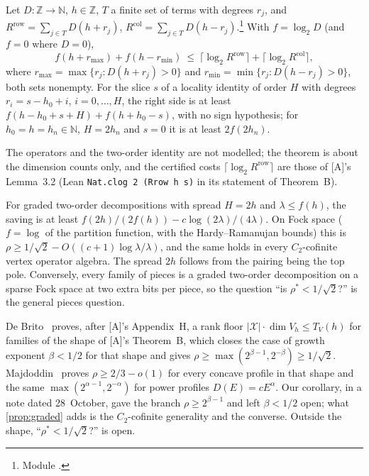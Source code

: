 \documentclass[10pt]{amsart}
\theoremstyle{plain}
\theoremstyle{definition}
\theoremstyle{remark}
\numberwithin{equation}{section}
\newcommand{\A}{\textup{[A]}}
\newcommand{\N}{\mathbb{N}}
\newcommand{\Z}{\mathbb{Z}}
\begin{document}
\begin{theorem}\label{thm:spread}
Let $D:\Z\to\N$, $h\in\Z$, $T$ a finite set of terms with degrees $r_j$, and
$R^{\mathrm{row}}=\sum_{j\in T}D(h+r_j)$, $R^{\mathrm{col}}=\sum_{j\in T}D(h-r_j)$.\footnote{Module
.} With $f=\log_2D$ (and $f=0$ where $D=0$),
\[
  f(h+r_{\max})+f(h-r_{\min})\ \le\ \lceil\log_2R^{\mathrm{row}}\rceil+\lceil\log_2R^{\mathrm{col}}\rceil,
\]
where $r_{\max}=\max\{r_j:D(h+r_j)>0\}$ and $r_{\min}=\min\{r_j:D(h-r_j)>0\}$, both sets nonempty. For
the slice $s$ of a locality identity of order $H$ with degrees $r_i=s-h_0+i$, $i=0,\dots,H$, the right
side is at least $f(h-h_0+s+H)+f(h+h_0-s)$, with no sign hypothesis; for $h_0=h=h_n\in\N$, $H=2h_n$ and
$s=0$ it is at least $2f(2h_n)$.
\end{theorem}

\noindent The operators and the two-order identity are not modelled; the theorem is about the
dimension counts only, and the certified costs $\lceil\log_2R^{\mathrm{row}}\rceil$ are those of \A's
Lemma~3.2 (Lean \texttt{Nat.clog 2 (Rrow h s)} in its statement of Theorem~B).

\begin{proposition}\label{prop:graded}
For graded two-order decompositions with spread $H=2h$ and $\lambda\le f(h)$, the saving is at least
$f(2h)/(2f(h))-c\log(2\lambda)/(4\lambda)$. On Fock space ($f=\log$ of the partition function, with the
Hardy--Ramanujan bounds) this is $\rho\ge1/\sqrt2-O((c+1)\log\lambda/\lambda)$, and the same holds in
every $C_2$-cofinite vertex operator algebra. The spread $2h$ follows from the pairing being the top
pole. Conversely, every family of pieces is a graded two-order decomposition on a sparse Fock space at
two extra bits per piece, so the question ``is $\rho^*<1/\sqrt2$?'' is the general pieces question.
\end{proposition}

\noindent De Brito~\cite{deBrito26} proves, after \A's Appendix~H, a rank floor
$|\mathcal X|\cdot\dim V_h\le T_V(h)$ for families of the shape of \A's Theorem~B, which closes the case
of growth exponent $\beta<1/2$ for that shape and gives $\rho\ge\max(2^{\beta-1},2^{-\beta})\ge1/\sqrt2$.
Majdoddin~\cite[Proposition~4.24 and the remark after it]{Maj26} proves $\rho\ge2/3-o(1)$ for every
concave profile in that shape and the same $\max(2^{\alpha-1},2^{-\alpha})$ for power profiles
$D(E)=cE^\alpha$. Our corollary, in a note dated 28~October, gave the branch $\rho\ge2^{\beta-1}$ and
left $\beta<1/2$ open; what \cref{prop:graded} adds is the $C_2$-cofinite generality and the converse.
Outside the shape, ``$\rho^*<1/\sqrt2$?'' is open.
\end{document}
